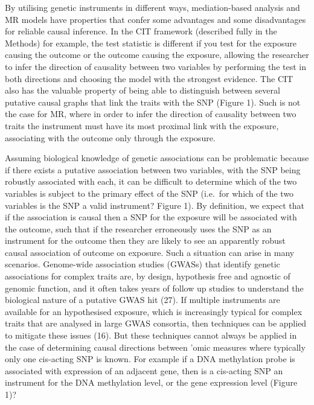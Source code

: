 \documentclass[]{article}
\begin{document}
By utilising genetic instruments in different ways, mediation-based
analysis and MR models have properties that confer some advantages and
some disadvantages for reliable causal inference. In the CIT framework
(described fully in the Methods) for example, the test statistic is
different if you test for the exposure causing the outcome or the
outcome causing the exposure, allowing the researcher to infer the
direction of causality between two variables by performing the test in
both directions and choosing the model with the strongest evidence. The
CIT also has the valuable property of being able to distinguish between
several putative causal graphs that link the traits with the SNP (Figure
1). Such is not the case for MR, where in order to infer the direction
of causality between two traits the instrument must have its most
proximal link with the exposure, associating with the outcome only
through the exposure.

Assuming biological knowledge of genetic associations can be problematic
because if there exists a putative association between two variables,
with the SNP being robustly associated with each, it can be difficult to
determine which of the two variables is subject to the primary effect of
the SNP (i.e.~for which of the two variables is the SNP a valid
instrument? Figure 1). By definition, we expect that if the association
is causal then a SNP for the exposure will be associated with the
outcome, such that if the researcher erroneously uses the SNP as an
instrument for the outcome then they are likely to see an apparently
robust causal association of outcome on exposure. Such a situation can
arise in many scenarios. Genome-wide association studies (GWASs) that
identify genetic associations for complex traits are, by design,
hypothesis free and agnostic of genomic function, and it often takes
years of follow up studies to understand the biological nature of a
putative GWAS hit (27). If multiple instruments are available for an
hypothesised exposure, which is increasingly typical for complex traits
that are analysed in large GWAS consortia, then techniques can be
applied to mitigate these issues (16). But these techniques cannot
always be applied in the case of determining causal directions between
'omic measures where typically only one cis-acting SNP is known. For
example if a DNA methylation probe is associated with expression of an
adjacent gene, then is a cis-acting SNP an instrument for the DNA
methylation level, or the gene expression level (Figure 1)?
\end{document}
